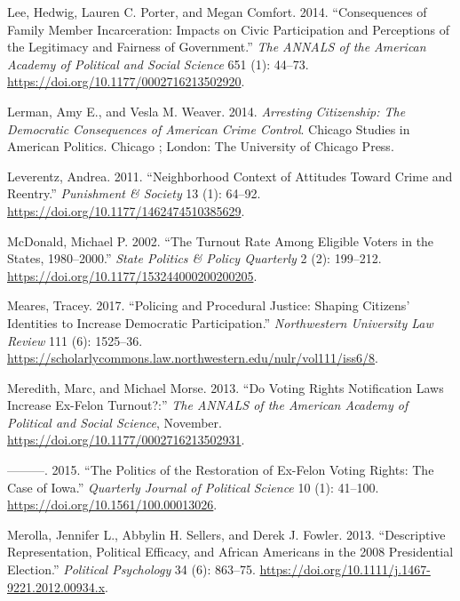 \documentclass[
  12pt,
]{article}
\newlength{\cslhangindent}
\newenvironment{cslreferences}%
  {\setlength{\parindent}{0pt}%
  \everypar{\setlength{\hangindent}{\cslhangindent}}\ignorespaces}%
  {\par}
\begin{document}
\begin{cslreferences}
\leavevmode\hypertarget{ref-Lee2014}{}%
Lee, Hedwig, Lauren C. Porter, and Megan Comfort. 2014. ``Consequences of Family Member Incarceration: Impacts on Civic Participation and Perceptions of the Legitimacy and Fairness of Government.'' \emph{The ANNALS of the American Academy of Political and Social Science} 651 (1): 44--73. \url{https://doi.org/10.1177/0002716213502920}.

\leavevmode\hypertarget{ref-Lerman2014}{}%
Lerman, Amy E., and Vesla M. Weaver. 2014. \emph{Arresting Citizenship: The Democratic Consequences of American Crime Control}. Chicago Studies in American Politics. Chicago ; London: The University of Chicago Press.

\leavevmode\hypertarget{ref-Leverentz2011}{}%
Leverentz, Andrea. 2011. ``Neighborhood Context of Attitudes Toward Crime and Reentry.'' \emph{Punishment \& Society} 13 (1): 64--92. \url{https://doi.org/10.1177/1462474510385629}.

\leavevmode\hypertarget{ref-McDonald2002}{}%
McDonald, Michael P. 2002. ``The Turnout Rate Among Eligible Voters in the States, 1980--2000.'' \emph{State Politics \& Policy Quarterly} 2 (2): 199--212. \url{https://doi.org/10.1177/153244000200200205}.

\leavevmode\hypertarget{ref-Meares2017}{}%
Meares, Tracey. 2017. ``Policing and Procedural Justice: Shaping Citizens' Identities to Increase Democratic Participation.'' \emph{Northwestern University Law Review} 111 (6): 1525--36. \url{https://scholarlycommons.law.northwestern.edu/nulr/vol111/iss6/8}.

\leavevmode\hypertarget{ref-Meredith2013}{}%
Meredith, Marc, and Michael Morse. 2013. ``Do Voting Rights Notification Laws Increase Ex-Felon Turnout?:'' \emph{The ANNALS of the American Academy of Political and Social Science}, November. \url{https://doi.org/10.1177/0002716213502931}.

\leavevmode\hypertarget{ref-Meredith2015}{}%
---------. 2015. ``The Politics of the Restoration of Ex-Felon Voting Rights: The Case of Iowa.'' \emph{Quarterly Journal of Political Science} 10 (1): 41--100. \url{https://doi.org/10.1561/100.00013026}.

\leavevmode\hypertarget{ref-Merolla2013}{}%
Merolla, Jennifer L., Abbylin H. Sellers, and Derek J. Fowler. 2013. ``Descriptive Representation, Political Efficacy, and African Americans in the 2008 Presidential Election.'' \emph{Political Psychology} 34 (6): 863--75. \url{https://doi.org/10.1111/j.1467-9221.2012.00934.x}.


\end{cslreferences}
\end{document}

